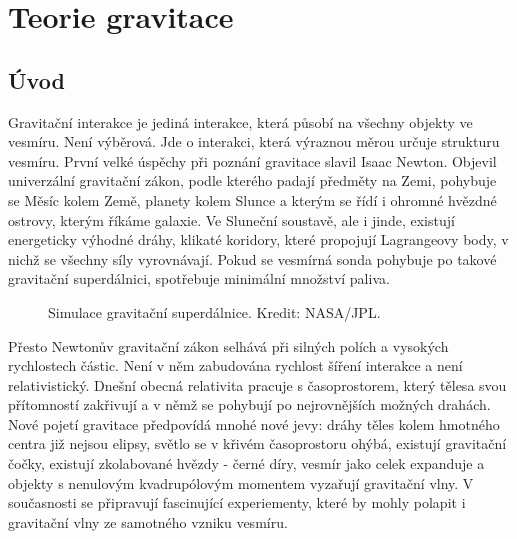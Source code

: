 \setchaptertoc
\chapter{Teorie gravitace}\label{fyz:chap_fey_gravity}

  \section{Úvod}
    Gravitační interakce je jediná interakce, která působí na všechny objekty ve vesmíru. Není
    výběrová. Jde o interakci, která výraznou měrou určuje strukturu vesmíru. První velké úspěchy
    při poznání gravitace slavil Isaac Newton. Objevil univerzální gravitační zákon, podle kterého
    padají předměty na Zemi, pohybuje se Měsíc kolem Země, planety kolem Slunce a kterým se řídí i
    ohromné hvězdné ostrovy, kterým říkáme galaxie. Ve Sluneční soustavě, ale i jinde, existují
    energeticky výhodné dráhy, klikaté koridory, které propojují Lagrangeovy body, v nichž se
    všechny síly vyrovnávají. Pokud se vesmírná sonda pohybuje po takové gravitační superdálnici,
    spotřebuje minimální množství paliva.

    \begin{figure}[ht!] %
      \centering
      \caption{Simulace gravitační superdálnice. Kredit: NASA/JPL. }
      \label{fyz:fig886}
    \end{figure}

    Přesto Newtonův gravitační zákon selhává při silných polích a vysokých rychlostech částic. Není
    v něm zabudována rychlost šíření interakce a není relativistický. Dnešní obecná relativita
    pracuje s časoprostorem, který tělesa svou přítomností zakřivují a v němž se pohybují po
    nejrovnějších možných drahách. Nové pojetí gravitace předpovídá mnohé nové jevy: dráhy těles
    kolem hmotného centra již nejsou elipsy, světlo se v křivém časoprostoru ohýbá, existují
    gravitační čočky, existují zkolabované hvězdy - černé díry, vesmír jako celek expanduje a
    objekty s nenulovým kvadrupólovým momentem vyzařují gravitační vlny. V současnosti se připravují
    fascinující experiementy, které by mohly polapit i gravitační vlny ze samotného vzniku vesmíru.

